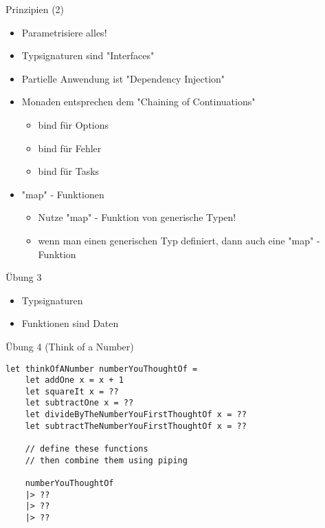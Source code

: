 \documentclass[t]{beamer}
\begin{document}
\begin{frame}[label={sec:org43f3a35}]{Prinzipien (2)}
\begin{itemize}
\item Parametrisiere alles!
\item Typsignaturen sind "Interfaces"
\item Partielle Anwendung ist "Dependency Injection"
\item Monaden entsprechen dem "Chaining of Continuations"
\begin{itemize}
\item bind für Options
\item bind für Fehler
\item bind für Tasks
\end{itemize}
\item "map" - Funktionen
\begin{itemize}
\item Nutze "map" - Funktion von generische Typen!
\item wenn man einen generischen Typ definiert, dann auch eine "map" - Funktion
\end{itemize}
\end{itemize}
\end{frame}

\begin{frame}[label={sec:org7ebf968}]{Übung 3}
\begin{itemize}
\item Typsignaturen
\item Funktionen sind Daten
\end{itemize}
\end{frame}

\begin{frame}[label={sec:org5e27385},fragile]{Übung 4 (Think of a Number)}
 \begin{verbatim}
let thinkOfANumber numberYouThoughtOf =
    let addOne x = x + 1
    let squareIt x = ??
    let subtractOne x = ??
    let divideByTheNumberYouFirstThoughtOf x = ??
    let subtractTheNumberYouFirstThoughtOf x = ??

    // define these functions
    // then combine them using piping

    numberYouThoughtOf
    |> ??
    |> ??
    |> ??
\end{verbatim}
\end{frame}
\end{document}
